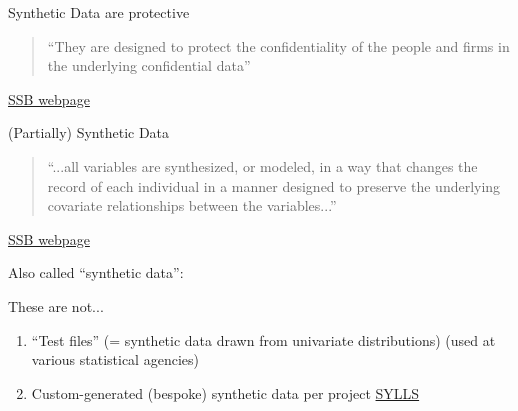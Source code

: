 

\begin{frame}{Synthetic Data are protective}
	\begin{quote}
		``They are
		designed to protect the confidentiality of the people and firms in the underlying
		confidential data''
	\end{quote}
{\tiny \href{http://www.census.gov/programs-surveys/sipp/methodology/sipp-synthetic-beta-data-product.html}{SSB webpage} }
\end{frame}

\begin{frame}{(Partially) Synthetic Data}
	\begin{quote}
		``...all variables are synthesized, or modeled, in a way that changes the record of each individual in a manner designed to preserve the underlying covariate relationships between the variables...''
	\end{quote}
	{\tiny \href{http://www.census.gov/programs-surveys/sipp/methodology/sipp-synthetic-beta-data-product.html}{SSB webpage} }
\end{frame}



\begin{frame}{Also called ``synthetic data'':}
	\begin{block}{These are not...}
	\begin{enumerate}
		\item ``Test files'' (= synthetic data drawn from univariate distributions) (used at various statistical agencies)\\
		\item Custom-generated (bespoke) synthetic data per project   \href{http://www.lscs.ac.uk/projects/synthetic-data-estimation-for-uk-longitudinal-studies/}{SYLLS} \\{\tiny \citep{synthpop}}
	\end{enumerate}
\end{block}
\end{frame}

